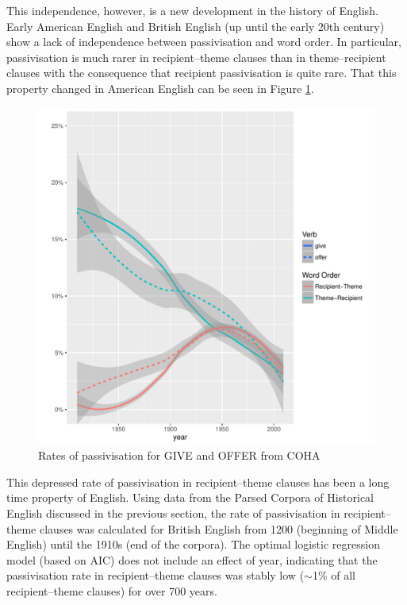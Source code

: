 	This independence, however, is a new development in the history of English. Early American English and British English (up until the early 20th century) show a lack of independence between passivisation and word order. In particular, passivisation is much rarer in recipient--theme clauses than in theme--recipient clauses with the consequence that recipient passivisation is quite rare. That this property changed in American English can be seen in Figure \ref{fig:am-change-pass}.


	\begin{figure}[ht!]
		\includegraphics[width=\linewidth]{../images/am-change-pass}
		\caption{Rates of passivisation for GIVE and OFFER from COHA}
		\label{fig:am-change-pass}
	\end{figure}

	This depressed rate of passivisation in recipient--theme clauses has been a long time property of English. Using data from the Parsed Corpora of Historical English discussed in the previous section, the rate of passivisation in recipient--theme clauses was calculated for British English from 1200 (beginning of Middle English) until the 1910s (end of the corpora). The optimal logistic regression model (based on AIC) does not include an effect of year, indicating that the passivisation rate in recipient--theme clauses was stably low ($\sim$1\% of all recipient--theme clauses) for over 700 years. 


